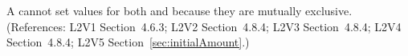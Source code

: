 A \Species cannot set values for both  and
 because they are mutually exclusive.  (References:
L2V1 Section~4.6.3; L2V2 Section~4.8.4; L2V3 Section~4.8.4; L2V4 Section~4.8.4; L2V5 Section~\ref{sec:initialAmount}.)
